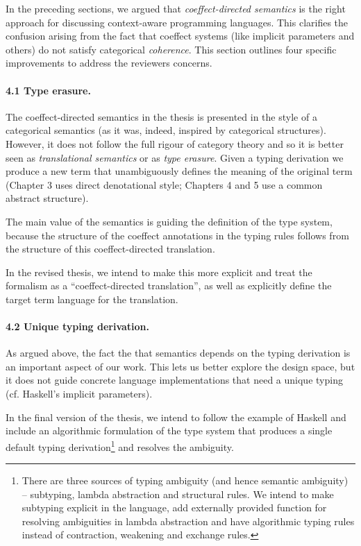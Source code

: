 \documentclass[
		twoside,openright,titlepage,numbers=noenddot,headinclude,%
                footinclude=true,cleardoublepage=empty,
                BCOR=10mm,paper=a4,fontsize=10pt, %
                ngerman,american, %
                ]{scrreprt}
\begin{document}
In the preceding sections, we argued that \emph{coeffect-directed semantics} is the right approach
for discussing context-aware programming languages. This clarifies the confusion arising from the
fact that coeffect systems (like implicit parameters and others) do not satisfy categorical
\emph{coherence}. This section outlines four specific improvements to address the reviewers concerns.

\vspace{-0.5em}
\paragraph{4.1 Type erasure.}
The coeffect-directed semantics in the thesis is presented in the style of a categorical semantics
(as it was, indeed, inspired by categorical structures). However, it does not follow the full rigour
of category theory and so it is better seen as \emph{translational semantics} or as \emph{type
erasure}. Given a typing derivation we produce a new term that unambiguously defines the meaning of
the original term (Chapter 3 uses direct denotational style; Chapters 4 and 5 use a common
abstract structure).

The main value of the semantics is guiding the definition of the type system, because the structure
of the coeffect annotations in the typing rules follows from the structure of this coeffect-directed
translation.

In the revised thesis, we intend to make this more explicit and treat the formalism as a
``coeffect-directed translation'', as well as explicitly define the target term language
for the translation.

\vspace{-0.5em}
\paragraph{4.2 Unique typing derivation.}

As argued above, the fact the that semantics depends on the typing derivation is an important
aspect of our work. This lets us better explore the design space, but it does not guide
concrete language implementations that need a unique typing (cf. Haskell's implicit parameters).

In the final version of the thesis, we intend to follow the example of Haskell and include an
algorithmic formulation of the type system that produces a single default typing
derivation\footnote{There are three sources of typing ambiguity (and hence semantic ambiguity) --
subtyping, lambda abstraction and structural rules. We intend to make subtyping explicit in the
language, add externally provided function for resolving ambiguities in lambda abstraction and
have algorithmic typing rules instead of contraction, weakening and exchange rules.} and
resolves the ambiguity.
\end{document}
